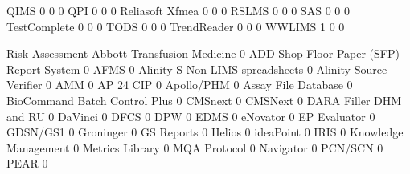 \documentclass{article}
\begin{document}
\begin{Schunk}
\begin{Soutput}
  QIMS                                         0            0             0
  QPI                                          0            0             0
  Reliasoft Xfmea                              0            0             0
  RSLMS                                        0            0             0
  SAS                                          0            0             0
  TestComplete                                 0            0             0
  TODS                                         0            0             0
  TrendReader                                  0            0             0
  WWLIMS                                       1            0             0
                                          
                                           Risk Assessment
  Abbott Transfusion Medicine                            0
  ADD Shop Floor Paper (SFP) Report System               0
  AFMS                                                   0
  Alinity S Non-LIMS spreadsheets                        0
  Alinity Source Verifier                                0
  AMM                                                    0
  AP 24 CIP                                              0
  Apollo/PHM                                             0
  Assay File Database                                    0
  BioCommand Batch Control Plus                          0
  CMSnext                                                0
  CMSNext                                                0
  DARA Filler DHM and RU                                 0
  DaVinci                                                0
  DFCS                                                   0
  DPW                                                    0
  EDMS                                                   0
  eNovator                                               0
  EP Evaluator                                           0
  GDSN/GS1                                               0
  Groninger                                              0
  GS Reports                                             0
  Helios                                                 0
  ideaPoint                                              0
  IRIS                                                   0
  Knowledge Management                                   0
  Metrics Library                                        0
  MQA Protocol                                           0
  Navigator                                              0
  PCN/SCN                                                0
  PEAR                                                   0

\end{Soutput}
\end{Schunk}
\end{document}
